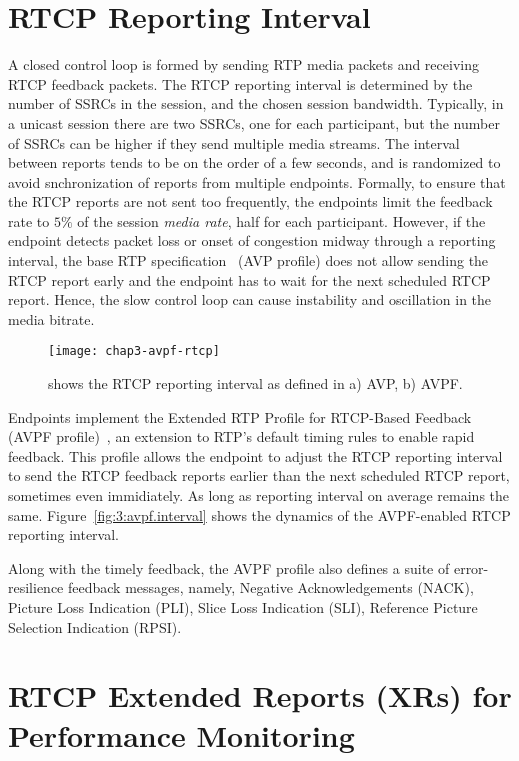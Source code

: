 \section{RTCP Reporting Interval}

A closed control loop is formed by sending RTP media packets and receiving
RTCP feedback packets. The RTCP reporting interval is determined by the number
of SSRCs in the session, and the chosen session bandwidth. Typically, in a
unicast session there are two SSRCs, one for each participant, but the number
of SSRCs can be higher if they send multiple media streams. The interval
between reports tends to be on the order of a few seconds, and is randomized
to avoid snchronization of reports from multiple endpoints. Formally, to
ensure that the RTCP reports are not sent too frequently, the endpoints limit
the feedback rate to $5\%$ of the session \textit{media rate}, half for each
participant. However, if the endpoint detects packet loss or onset of
congestion midway through a reporting interval, the base RTP
specification~\cite{rfc3550} (AVP profile) does not allow sending the RTCP
report early and the endpoint has to wait for the next scheduled RTCP report.
Hence, the slow control loop can cause instability and oscillation in the
media bitrate.

\begin{figure}[!h]
\centerline{\texttt{[image: chap3-avpf-rtcp]}}
\caption{shows the RTCP reporting interval as defined in a) AVP, b) AVPF.}
\label{fig:3:avpf}
\end{figure}


Endpoints implement the Extended RTP Profile for RTCP-Based Feedback (AVPF
profile)~\cite{rfc4585}, an extension to RTP's default timing rules to enable
rapid feedback. This profile allows the endpoint to adjust the RTCP reporting
interval to send the RTCP feedback reports earlier than the next scheduled
RTCP report, sometimes even immidiately. As long as reporting interval on
average remains the same. Figure~\ref{fig:3:avpf.interval} shows the dynamics
of the AVPF-enabled RTCP reporting interval.

Along with the timely feedback, the AVPF profile also defines a suite of
error-resilience feedback messages, namely, Negative Acknowledgements (NACK),
Picture Loss Indication (PLI), Slice Loss Indication (SLI), Reference Picture
Selection Indication (RPSI).

\section{RTCP Extended Reports (XRs) for Performance Monitoring}

